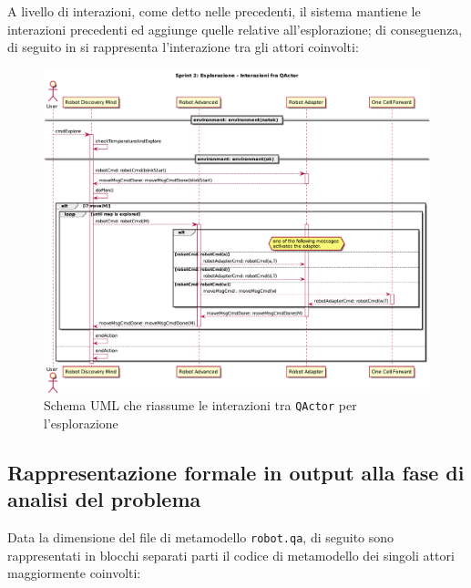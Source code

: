 A livello di interazioni, come detto nelle  precedenti, il sistema mantiene le interazioni precedenti ed aggiunge quelle relative all'esplorazione;
di conseguenza, di seguito in  si rappresenta l'interazione tra gli attori coinvolti:

\begin{figure}[H]
  \centering
  \includegraphics[width=\textwidth]{res/sprint2/explore}
  \caption{Schema UML che riassume le interazioni tra \texttt{QActor} per l'esplorazione}%
  \label{fig:sp2:explore}
\end{figure}

\newpage

\subsection[Rappresentazione formale]{Rappresentazione formale in output alla fase di analisi del problema}

Data la dimensione del file di metamodello \texttt{robot.qa}, di seguito sono rappresentati in blocchi separati parti il codice di metamodello dei singoli attori maggiormente coinvolti:

% 



